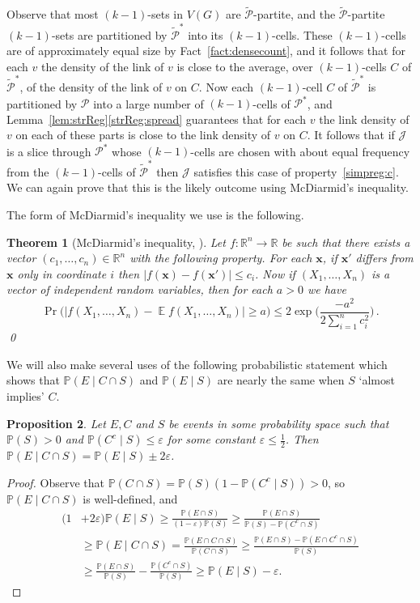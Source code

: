 \documentclass[12pt,a4paper]{amsart}
\let\eps\varepsilon
\newtheorem{theorem}{Theorem}%
\newtheorem{proposition}[theorem] {Proposition}
\newcommand{\Prob}{\mathbb{P}}
\newcommand{\REALS}{\mathbb{R}}
\newcommand{\Exp}{\mathop{\mathbb{E}}}
\newcommand{\cJ}{\mathcal{J}}
\newcommand{\Part}{\mathcal{P}}
\begin{document}
Observe that most $(k-1)$-sets in $V(G)$ are $\tilde{\Part}$-partite, and the $\tilde{\Part}$-partite $(k-1)$-sets are partitioned by $\tilde{\Part}^*$ into its $(k-1)$-cells. These $(k-1)$-cells are of approximately equal size by Fact~\ref{fact:densecount}, and it follows that for each $v$ the density of the link of $v$ is close to the average, over $(k-1)$-cells $C$ of $\tilde{\Part}^*$, of the density of the link of $v$ on $C$. Now each $(k-1)$-cell $C$ of $\tilde{\Part}^*$ is partitioned by $\Part$ into a large number of $(k-1)$-cells of $\Part^*$, and Lemma~\ref{lem:strReg}\ref{strReg:spread} guarantees that for each $v$ the link density of $v$ on each of these parts is close to the link density of $v$ on $C$. It follows that if $\cJ$ is a slice through $\Part^*$ whose $(k-1)$-cells are chosen with about equal frequency from the $(k-1)$-cells of $\tilde{\Part}^*$ then $\cJ$ satisfies this case of property~\ref{simpreg:c}. We can again prove that this is the likely outcome using McDiarmid's inequality.

\smallskip

The form of McDiarmid's inequality we use is the following.

\begin{theorem}[McDiarmid's inequality, \cite{McDiarmid}]\label{thm:azuma} 
  Let $f:\REALS^n\to\REALS$ be such that there
  exists a vector $(c_1,\ldots,c_n)\in\REALS^n$ with the following property. For
  each $\mathbf{x}$, if $\mathbf{x}'$ differs from $\mathbf{x}$ only in 
  coordinate $i$ then $\big|f(\mathbf{x})-f(\mathbf{x}')\big|\le c_i$. Now if
  $(X_1,\ldots,X_n)$ is a vector of independent random variables, then for each $a> 0$ we have
  \[\Pr\Big(\big|f(X_1,\ldots,X_n)-\Exp f(X_1,\ldots,X_n)\big|\ge a\Big)\le
  2\exp \Big(\frac{-a^2}{2\sum_{i=1}^n c_i^2}\Big)\,. \] \qed
\end{theorem}

We will also make several uses of the following probabilistic statement which shows that $\Prob(E\mid C\cap S)$ and $\Prob(E\mid S)$ are nearly the same when $S$ `almost implies' $C$.

\begin{proposition} \label{prop:condprob}
Let $E, C$ and $S$ be events in some probability space such that $\Prob(S) > 0$ and $\Prob(C^c \mid S) \leq \eps$ for some constant $\eps \leq \tfrac{1}{2}$. Then $\Prob(E \mid C \cap S) = \Prob(E \mid S) \pm 2\eps$.
\end{proposition}

\begin{proof}
Observe that $\Prob(C \cap S) = \Prob(S)(1-\Prob(C^c \mid S)) > 0$, so $\Prob(E \mid C \cap S)$ is well-defined, and
\begin{align*}
(1&+2\eps)\Prob(E \mid S)
\geq
\frac{\Prob(E \cap S)}{(1-\eps) \Prob(S)}
\geq
\frac{\Prob(E \cap S)}{\Prob(S) - \Prob(C^c \cap S)}\\
&\geq
\Prob(E \mid C \cap S)
=
\frac{\Prob(E \cap C \cap S)}{\Prob(C \cap S)}
\geq
\frac{\Prob(E \cap S) - \Prob(E \cap C^c \cap S)}{\Prob(S)} \\
&\geq
\frac{\Prob(E \cap S)}{\Prob(S)} - \frac{\Prob(C^c \cap S)}{\Prob(S)}
\geq
\Prob(E \mid S) - \eps.
\end{align*}
\end{proof} 
\end{document}
